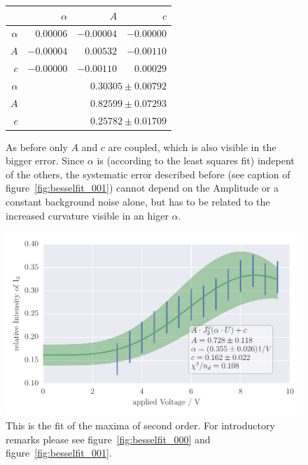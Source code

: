 \begin{figure}
\caption{
As before only $A$ and $c$ are coupled, which is also visible in the
bigger error. Since $\alpha$ is (according to the least squares fit)
indepent of the others, the systematic error described before (see caption of figure~\ref{fig:besselfit_001}) 
cannot depend on the Amplitude or a constant background noise alone, but has to be related to the increased curvature
visible in an higer $\alpha$.}
 \begin{tabular}{|r|r|r|r|}
 \hline 
\cellcolor{tabcolor}&\cellcolor{tabcolor}$\alpha$&\cellcolor{tabcolor}$A$&\cellcolor{tabcolor}$c$\\ \hline 
 \cellcolor{tabcolor}$\alpha$&$0.00006$ &$-0.00004$ &$-0.00000$ \\ 
\cellcolor{tabcolor}$A$&$-0.00004$ &$0.00532$ &$-0.00110$ \\ 
\cellcolor{tabcolor}$c$&$-0.00000$ &$-0.00110$ &$0.00029$ \\ \hline \hline
\cellcolor{tabcolor}$\alpha$&\multicolumn{3}{r|}{$0.30305 \pm 0.00792$ }\\ 
\cellcolor{tabcolor}$A$&\multicolumn{3}{r|}{$0.82599 \pm 0.07293$ }\\ 
\cellcolor{tabcolor}$c$&\multicolumn{3}{r|}{$0.25782 \pm 0.01709$ }\\ 
\hline\end{tabular}
\end{figure}
\newpage
\begin{figure}[htpb]
    \centering
    \includegraphics[width=1\textwidth]{analysis/figures/besselfit_002}
    \caption{This is the fit of the maxima of second order. For
    introductory remarks please see figure~\ref{fig:besselfit_000} and figure~\ref{fig:besselfit_001}.
    }
    \label{fig:besselfit_002}
\end{figure}

